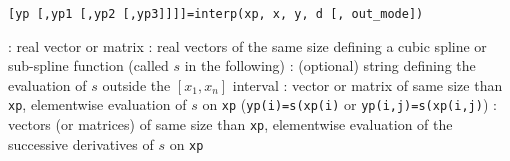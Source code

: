 
\begin{mandesc}
\end{mandesc}

\begin{calling_sequence}
    \begin{verbatim}
[yp [,yp1 [,yp2 [,yp3]]]]=interp(xp, x, y, d [, out_mode])
    \end{verbatim}
\end{calling_sequence}

\begin{parameters}
  \begin{varlist}
   : real vector or matrix
   : real vectors of the same size defining a cubic spline or sub-spline function 
                (called $s$ in the following)
   : (optional) string defining the evaluation of $s$ outside the $[x_1,x_n]$ interval
   : vector or matrix of same size than \verb!xp!, elementwise evaluation of $s$
                on \verb!xp! (\verb!yp(i)=s(xp(i)! or \verb!yp(i,j)=s(xp(i,j)!)
   : vectors (or matrices) of same size than \verb!xp!, elementwise evaluation of the 
                successive derivatives of $s$ on \verb!xp!
  \end{varlist}
\end{parameters}


